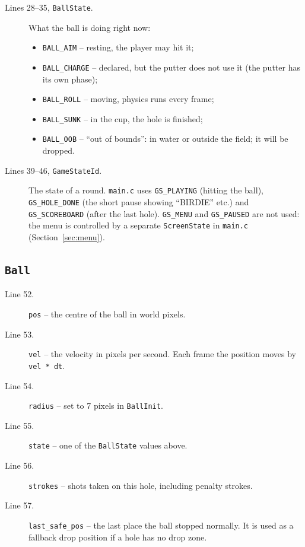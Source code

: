 \documentclass[11pt,a4paper]{article}
\newcommand{\code}[3]{}
\begin{document}
\begin{description}
  \item[Lines 28--35, \texttt{BallState}.] What the ball is doing right now:
  \begin{itemize}
    \item \texttt{BALL\_AIM} -- resting, the player may hit it;
    \item \texttt{BALL\_CHARGE} -- declared, but the putter does not use it (the putter has its own phase);
    \item \texttt{BALL\_ROLL} -- moving, physics runs every frame;
    \item \texttt{BALL\_SUNK} -- in the cup, the hole is finished;
    \item \texttt{BALL\_OOB} -- ``out of bounds'': in water or outside the field; it will be dropped.
  \end{itemize}
  \item[Lines 39--46, \texttt{GameStateId}.] The state of a round. \texttt{main.c} uses \texttt{GS\_PLAYING}
  (hitting the ball), \texttt{GS\_HOLE\_DONE} (the short pause showing ``BIRDIE'' etc.) and
  \texttt{GS\_SCOREBOARD} (after the last hole). \texttt{GS\_MENU} and \texttt{GS\_PAUSED} are not used: the
  menu is controlled by a separate \texttt{ScreenState} in \texttt{main.c} (Section~\ref{sec:menu}).
\end{description}

\subsection{\texttt{Ball}}

\code{types.h}{49}{58}

\begin{description}
  \item[Line 52.] \texttt{pos} -- the centre of the ball in world pixels.
  \item[Line 53.] \texttt{vel} -- the velocity in pixels per second. Each frame the position moves by
  \texttt{vel * dt}.
  \item[Line 54.] \texttt{radius} -- set to 7 pixels in \texttt{BallInit}.
  \item[Line 55.] \texttt{state} -- one of the \texttt{BallState} values above.
  \item[Line 56.] \texttt{strokes} -- shots taken on this hole, including penalty strokes.
  \item[Line 57.] \texttt{last\_safe\_pos} -- the last place the ball stopped normally. It is used as a fallback
  drop position if a hole has no drop zone.
\end{description}
\end{document}
